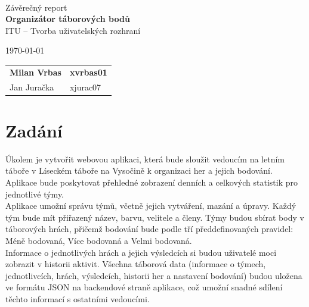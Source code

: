 \documentclass[a4paper, 12pt]{article} %
\begin{document}
\begin{titlepage}
    \begin{center}
         \\
        \Huge{Závěrečný report} \\
        \Large{\textbf{Organizátor táborových bodů}} \\
        \large{ITU – Tvorba uživatelských rozhraní }
    \end{center}

    {\large \today \hfill
        \large
        \begin{tabular}{l l}
        \textbf{Milan Vrbas} & \quad \textbf{xvrbas01}\\
        Jan Juračka           & \quad xjurac07      \\
        \end{tabular}
        }
\end{titlepage}

\section{Zadání}
Úkolem je vytvořit webovou aplikaci, která bude sloužit vedoucím na letním táboře v 
Líseckém táboře na Vysočině k organizaci her a jejich bodování. Aplikace bude poskytovat 
přehledné zobrazení denních a celkových statistik pro jednotlivé týmy. \\
Aplikace umožní správu týmů, včetně jejich vytváření, mazání a úpravy. Každý tým bude mít 
přiřazený název, barvu, velitele a členy. Týmy budou sbírat body v táborových hrách, přičemž 
bodování bude podle tří předdefinovaných pravidel: Méně bodovaná, Více bodovaná a Velmi bodovaná. \\
Informace o jednotlivých hrách a jejich výsledcích si budou uživatelé moci zobrazit v 
historii aktivit. Všechna táborová data (informace o týmech, jednotlivcích, 
hrách, výsledcích, historii her a nastavení bodování) budou uložena ve formátu JSON na 
backendové straně aplikace, což umožní snadné sdílení těchto informací s ostatními vedoucími.
\end{document}
